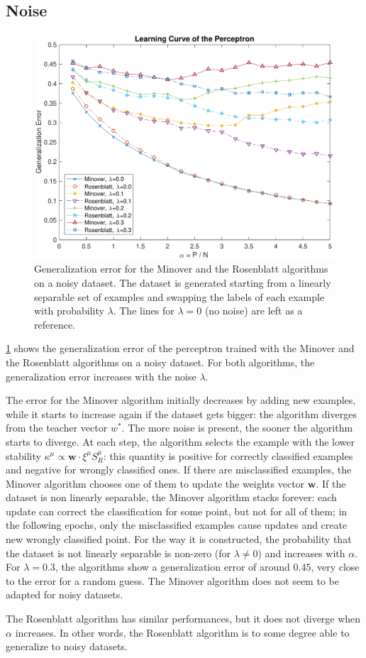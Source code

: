 \subsection{Noise}
\begin{figure}[t]
	\centering
	\includegraphics[width=\columnwidth]{figures/noise}
    \caption{Generalization error for the Minover and the Rosenblatt algorithms on a noisy dataset. The dataset is generated starting from a linearly separable set of examples and swapping the labels of each example with probability $\lambda$. The lines for $\lambda = 0$ (no noise) are left as a reference.}
	\label{fig:noise}
\end{figure}

\cref{fig:noise} shows the generalization error of the perceptron trained with the Minover and the Rosenblatt algorithms on a noisy dataset.
For both algorithms, the generalization error increases with the noise $\lambda$.

The error for the Minover algorithm initially decreases by adding new examples, while it starts to increase again if the dataset gets bigger:
the algorithm diverges from the teacher vector $w^{*}$.
The more noise is present, the sooner the algorithm starts to diverge.
At each step, the algorithm selects the example with the lower stability $\kappa^\mu \propto \bm{w} \cdotp \xi^\mu S^\mu_R$:
this quantity is positive for correctly classified examples and negative for wrongly classified ones.
If there are misclassified examples, the Minover algorithm chooses one of them to update the weights vector $\bm{w}$.
If the dataset is non linearly separable, the Minover algorithm stacks forever:
each update can correct the classification for some point, but not for all of them;
in the following epochs, only the misclassified examples cause updates and create new wrongly classified point.
For the way it is constructed, the probability that the dataset is not linearly separable is non-zero (for $\lambda \ne 0$) and increases with $\alpha$.
For $\lambda = 0.3$, the algorithms show a generalization error of around $0.45$, very close to the error for a random guess.
The Minover algorithm does not seem to be adapted for noisy datasets.

The Rosenblatt algorithm has similar performances, but it does not diverge when $\alpha$ increases.
In other words, the Rosenblatt algorithm is to some degree able to generalize to noisy datasets.
